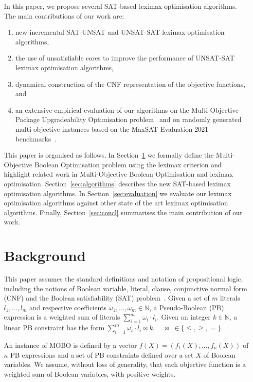 \documentclass[a4paper,UKenglish,cleveref, autoref, thm-restate]{lipics-v2021}
\begin{document}
In this paper, we propose several SAT-based leximax optimisation algorithms.
The main contributions of our work are:
\begin{enumerate}
\item new incremental SAT-UNSAT and UNSAT-SAT leximax optimisation algorithms,
\item the use of unsatisfiable cores to improve the performance of UNSAT-SAT
leximax optimisation algorithms,
\item dynamical construction of the CNF representation of the 
objective functions, and
\item an extensive empirical evaluation of our algorithms on the Multi-Objective Package Upgradeability Optimisation problem~\cite{mancoosi-competition} and on randomly generated multi-objective instances based on the MaxSAT Evaluation 2021 benchmarks~\cite{maxsat-eval-2021}.
\end{enumerate}

This paper is organised as follows. In Section~\ref{sec:backg} we formally
define the Multi-Objective Boolean Optimisation problem using the leximax criterion and highlight related work in Multi-Objective Boolean Optimisation 
and leximax optimisation.
Section~\ref{sec:algorithms} describes the new SAT-based leximax optimisation algorithms.
In Section~\ref{sec:evaluation} we evaluate our leximax optimisation algorithms against other state of the art leximax optimisation algorithms.
Finally, Section~\ref{sec:concl} summarises the main contribution of our work. 
\section{Background}
\label{sec:backg}

This paper assumes the standard definitions and notation of propositional logic, including the notions of Boolean variable, literal, clause, conjunctive normal form (CNF) and the Boolean satisfiability (SAT) problem~\cite{handbook}.
Given a set of $m$ literals $l_1, \dots, l_m$ and respective coefficients
$\omega_1, \dots, \omega_m \in \mathbb{N}$, a Pseudo-Boolean (PB) 
expression is a weighted sum of literals $\sum_{i = 1}^m \omega_i \cdot l_i$.
Given an integer $k \in \mathbb{N}$, a linear PB constraint has the form
$\sum_{i = 1}^m \omega_i \cdot l_i \bowtie k, \quad \bowtie \;\in \lbrace \le, \ge, = \rbrace$.

\begin{definition}
An instance of MOBO is defined by a vector $f(X) = (f_1(X), \dots, f_n(X))$ of $n$ PB expressions and a
set of PB constraints defined over a set $X$ of Boolean variables.
We assume, without loss of generality, that each objective function is a 
weighted sum of Boolean variables, with positive weights.
\end{definition}
\end{document}
